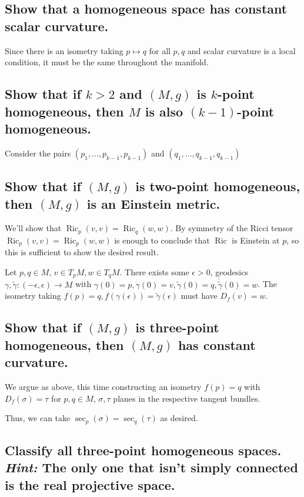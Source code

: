 \documentclass[10pt]{article}
\DeclareMathOperator{\ric}{Ric}
\DeclareMathOperator{\2}{II}
\newcommand{\hint}[1]{{\emph{Hint:} #1}} %
\begin{document}
\subsection{Show that a homogeneous space has constant scalar curvature.}
Since there is an isometry taking $p \mapsto q$ for all $p,q$ and scalar curvature is a local condition, it must be the same throughout the manifold.
\subsection{Show that if $k > 2$ and $(M,g)$ is $k$-point homogeneous, then $M$ is also $(k-1)$-point homogeneous.}
Consider the pairs $(p_1, \dots, p_{k-1},  p_{k-1})$ and $(q_1, \dots, q_{k-1}, q_{k-1})$ 
\subsection{Show that if $(M,g)$ is two-point homogeneous, then $(M,g)$ is an Einstein metric.}
We'll show that $\ric_p(v,v) = \ric_q(w,w)$. By symmetry of the Ricci tensor $\ric_p(v,v) = \ric_p(w,w)$ is enough to conclude that $\ric$ is Einstein at $p$, so this is sufficient to show the desired result.

Let $p,q \in M$, $v \in T_p M , w \in T_q M$. There exists some $\epsilon > 0$, geodesics $\gamma, \tilde{\gamma} : (-\epsilon , \epsilon) \to M$ with $\gamma(0) = p , \dot{\gamma}(0) = v, \tilde{\gamma}(0) = q, \dot{\tilde{\gamma}}(0) = w$. The isometry taking $f(p) = q, f(\gamma(\epsilon) ) = \tilde{\gamma}(\epsilon)$ must have $D_f (v) = w $.
\subsection{Show that if $(M,g)$ is three-point homogeneous, then $(M,g)$ has constant curvature.}
We argue as above, this time constructing an isometry $f(p) = q$ with $D_f( \sigma) = \tau$ for $p,q \in M$, $\sigma, \tau$ planes in the respective tangent bundles.

Thus, we can take $\sec_p(\sigma) = \sec_q(\tau)$ as desired.
\subsection{Classify all three-point homogeneous spaces. \hint{The only one that isn't simply connected is the real projective space.}}
\end{document}
